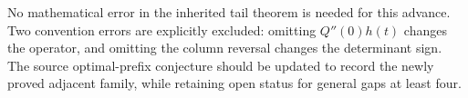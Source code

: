 No mathematical error in the inherited tail theorem is needed for
this advance.  Two convention errors are explicitly excluded:
omitting $Q''(0)h(t)$ changes the operator, and omitting the column
reversal changes the determinant sign.  The source optimal-prefix
conjecture should be updated to record the newly proved adjacent
family, while retaining open status for general gaps at least four.
